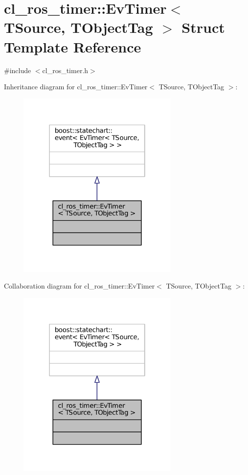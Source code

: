 \hypertarget{structcl__ros__timer_1_1EvTimer}{}\section{cl\+\_\+ros\+\_\+timer\+:\+:Ev\+Timer$<$ T\+Source, T\+Object\+Tag $>$ Struct Template Reference}
\label{structcl__ros__timer_1_1EvTimer}


{\ttfamily \#include $<$cl\+\_\+ros\+\_\+timer.\+h$>$}



Inheritance diagram for cl\+\_\+ros\+\_\+timer\+:\+:Ev\+Timer$<$ T\+Source, T\+Object\+Tag $>$\+:
\nopagebreak
\begin{figure}[H]
\begin{center}
\leavevmode
\includegraphics[width=226pt]{structcl__ros__timer_1_1EvTimer__inherit__graph}
\end{center}
\end{figure}


Collaboration diagram for cl\+\_\+ros\+\_\+timer\+:\+:Ev\+Timer$<$ T\+Source, T\+Object\+Tag $>$\+:
\nopagebreak
\begin{figure}[H]
\begin{center}
\leavevmode
\includegraphics[width=226pt]{structcl__ros__timer_1_1EvTimer__coll__graph}
\end{center}
\end{figure}


